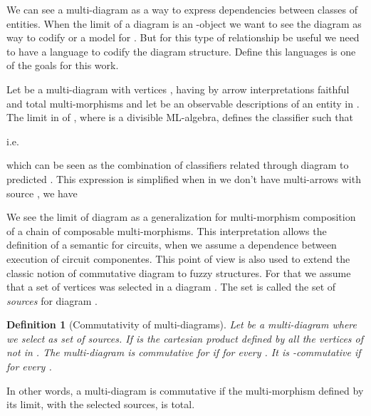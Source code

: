\documentclass[oribibl]{llncs}
\newtheorem{defn}{Definition}
\begin{document}
We can see a multi-diagram as a way to express dependencies between classes of entities. When the limit of a diagram  is an -object  we want to see the diagram as way to codify  or a model for . But for this type of relationship be useful we need to have a language to codify the diagram structure. Define this languages is one of the goals for this work.

Let  be a multi-diagram with vertices , having by arrow interpretations faithful and total multi-morphisms and let  be an observable descriptions of an entity in . The limit in  of , where  is a divisible ML-algebra, defines the classifier  such that

i.e.

which can be seen as the combination of classifiers related through diagram  to predicted . This expression is simplified when in  we don't have multi-arrows with source , we have



We see the limit of diagram as a generalization for multi-morphism composition of a chain of composable multi-morphisms. This interpretation allows the definition of a semantic for circuits, when we assume a dependence between execution of circuit componentes. This point of view is also used to extend the classic notion of commutative diagram to fuzzy structures. For that we assume that a set of vertices  was selected in a diagram . The set  is  called the set of \emph{sources} for diagram .

\begin{defn}[Commutativity of multi-diagrams]
Let  be a multi-diagram where we select  as set of sources. If  is the cartesian product defined by all the vertices of  not in . The multi-diagram  is commutative for  if  for every . It is -commutative if  for every .
\end{defn}

In other words, a multi-diagram is commutative if the multi-morphism defined by its limit, with the selected sources, is total.
\end{document}
